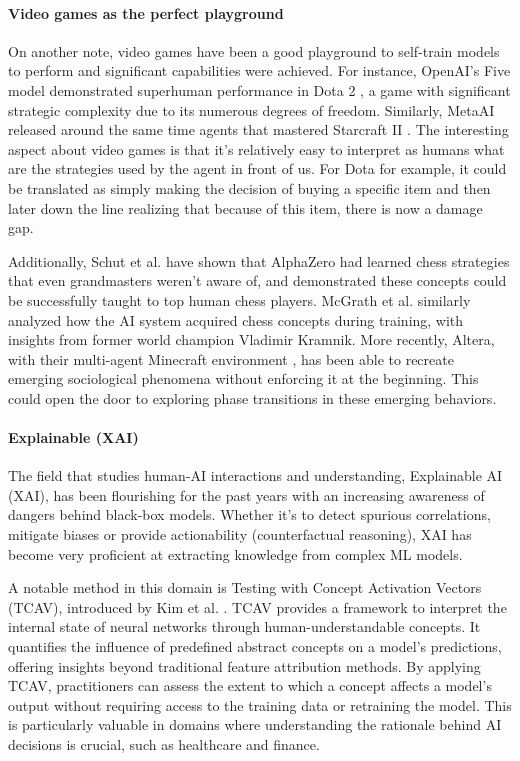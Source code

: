 \documentclass[11pt]{article}
\begin{document}
\paragraph{Video games as the perfect playground}On another note, video games have been a good playground to self-train models to perform and significant capabilities were achieved.
For instance, OpenAI's Five model demonstrated superhuman performance in Dota 2 \cite{openai_five}, a game with significant strategic complexity due to its numerous degrees of freedom. Similarly, MetaAI released around the same time agents that mastered Starcraft II \cite{fair_starcraft}.
The interesting aspect about video games is that it's relatively easy to interpret as humans what are the strategies used by the agent in front of us. For Dota for example, it could be translated as simply making the decision of buying a specific item and then later down the line realizing that because of this item, there is now a damage gap.

Additionally, Schut et al. \cite{schut} have shown that AlphaZero had learned chess strategies that even grandmasters weren't aware of, and demonstrated these concepts could be successfully taught to top human chess players. McGrath et al. \cite{alphazero-chess} similarly analyzed how the AI system acquired chess concepts during training, with insights from former world champion Vladimir Kramnik.
More recently, Altera, with their multi-agent Minecraft environment \cite{altera}, has been able to recreate emerging sociological phenomena without enforcing it at the beginning. This could open the door to exploring phase transitions in these emerging behaviors.

\paragraph{Explainable (XAI)}The field that studies human-AI interactions and understanding, Explainable AI (XAI), has been flourishing for the past years with an increasing awareness of dangers behind black-box models. Whether it's to detect spurious correlations, mitigate biases or provide actionability (counterfactual reasoning), XAI has become very proficient at extracting knowledge from complex ML models.

A notable method in this domain is Testing with Concept Activation Vectors (TCAV), introduced by Kim et al. \cite{tcav}. TCAV provides a framework to interpret the internal state of neural networks through human-understandable concepts. It quantifies the influence of predefined abstract concepts on a model's predictions, offering insights beyond traditional feature attribution methods.
By applying TCAV, practitioners can assess the extent to which a concept affects a model's output without requiring access to the training data or retraining the model. This is particularly valuable in domains where understanding the rationale behind AI decisions is crucial, such as healthcare and finance.
\end{document}
